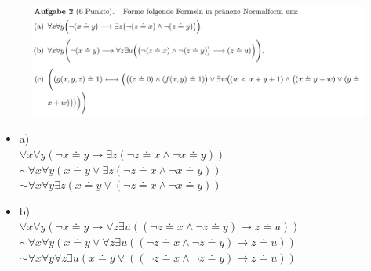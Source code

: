 \documentclass[a4paper]{scrartcl}
\begin{document}
    \begin{figure}[H]
        \centering
        \includegraphics[scale=0.3]{./A-2.png}
        \label{fig:}
    \end{figure}

    \begin{itemize}
        \item a)\\
            $\forall x \forall y (\neg x \doteq y \rightarrow \exists z (\neg z \doteq x \land \neg x \doteq y))$\\
            $\sim \forall x \forall y (x \doteq y \lor \exists z (\neg z \doteq x \land \neg x \doteq y))$\\
            $\sim \forall x \forall y \exists z (x \doteq y \lor (\neg z \doteq x \land \neg x \doteq y))$\\

        \item b)\\
            $\forall x \forall y (\neg x \doteq y \rightarrow \forall z \exists u ((\neg z \doteq x \land \neg z \doteq y) \rightarrow z \doteq u))$\\
            $\sim \forall x \forall y (x \doteq y \lor \forall z \exists u ((\neg z \doteq x \land \neg z \doteq y) \rightarrow z \doteq u))$\\
            $\sim \forall x \forall y \forall z \exists u (x \doteq y \lor ((\neg z \doteq x \land \neg z \doteq y) \rightarrow z \doteq u))$\\


\end{itemize}
\end{document}
